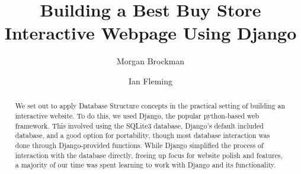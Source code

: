 \documentclass[sigconf]{acmart}
\begin{document}
\title{Building a Best Buy Store Interactive Webpage Using Django}

\author{Morgan Brockman}

\author{Ian Fleming}


\begin{abstract}

We set out to apply Database Structure concepts in the practical setting of building an interactive website. To do this, we used Django, the popular python-based web framework. This involved using the SQLite3 database, Django's default included database, and a good option for portability, though most database interaction was done through Django-provided functions. While Django simplified the process of interaction with the database directly, freeing up focus for website polish and features, a majority of our time was spent learning to work with Django and its functionality.

\end{abstract}
\end{document}
